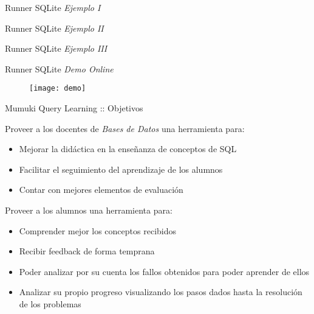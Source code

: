 \documentclass{beamer}
\begin{document}
\begin{frame}[fragile]
    {Runner SQLite}
    {\emph{Ejemplo I}}

    

\end{frame}

\begin{frame}[fragile]
    {Runner SQLite}
    {\emph{Ejemplo II}}

    

\end{frame}

\begin{frame}[fragile]
    {Runner SQLite}
    {\emph{Ejemplo III}}

    

\end{frame}

\begin{frame}
    {Runner SQLite}
    {\emph{Demo Online}}


    \begin{figure}[h]
        \texttt{[image: demo]}
    \end{figure}

\end{frame}

\begin{frame}
    {Mumuki Query Learning :: Objetivos}

    Proveer a los docentes de \textit{Bases de Datos} una herramienta para:

    \begin{itemize}
        \item Mejorar la didáctica en la enseñanza de conceptos de SQL
        \item Facilitar el seguimiento del aprendizaje de los alumnos
        \item Contar con mejores elementos de evaluación
    \end{itemize}

    \vspace{1em}

    Proveer a los alumnos una herramienta para:

    \begin{itemize}
        \item Comprender mejor los conceptos recibidos
        \item Recibir feedback de forma temprana
        \item Poder analizar por su cuenta los fallos obtenidos para poder aprender de ellos
        \item Analizar su propio progreso visualizando los pasos dados hasta la resolución de los problemas
    \end{itemize}
\end{frame}
\end{document}
